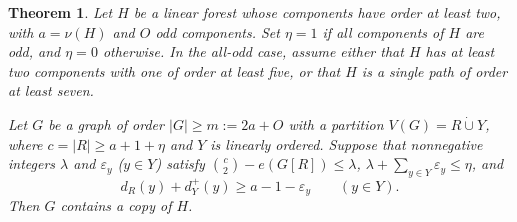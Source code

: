\documentclass[10pt]{article}
\theoremstyle{compactplain}
\newtheorem{theorem}{Theorem}[section]
\theoremstyle{remark}\newtheorem{remark}[theorem]{Remark}
\begin{document}
\begin{theorem}\label{thm:dense-core-factor}
Let $H$ be a linear forest whose components have order at least two,
with $a=\nu(H)$ and $O$ odd components. Set $\eta=1$ if all components
of $H$ are odd, and $\eta=0$ otherwise. In the all-odd case, assume
either that $H$ has at least two components with one of order at least
five, or that $H$ is a single path of order at least seven.

Let $G$ be a graph of order $|G|\ge m:=2a+O$ with a partition
$V(G)=R\dot\cup Y$, where $c=|R|\ge a+1+\eta$ and $Y$ is linearly
ordered. Suppose that nonnegative integers $\lambda$ and $\varepsilon_y$
($y\in Y$) satisfy $\binom{c}{2}-e(G[R])\le\lambda$,
$\lambda+\sum_{y\in Y}\varepsilon_y\le\eta$, and
\begin{equation}\label{eq:dense-core-degree}
 d_R(y)+d_Y^+(y)\ge a-1-\varepsilon_y \qquad (y\in Y).
\end{equation}
Then $G$ contains a copy of $H$.
\end{theorem}
\end{document}
